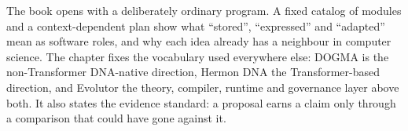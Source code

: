 The book opens with a deliberately ordinary program. A fixed catalog of modules and a context-dependent plan show what ``stored'', ``expressed'' and ``adapted'' mean as software roles, and why each idea already has a neighbour in computer science. The chapter fixes the vocabulary used everywhere else: DOGMA is the non-Transformer DNA-native direction, Hermon DNA the Transformer-based direction, and Evolutor the theory, compiler, runtime and governance layer above both. It also states the evidence standard: a proposal earns a claim only through a comparison that could have gone against it.
